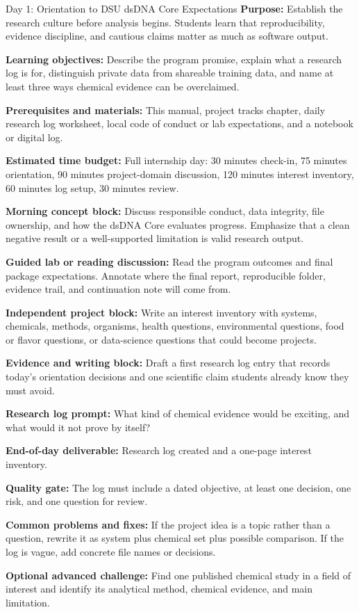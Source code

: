 \begin{dailybox}{Day 1: Orientation to DSU dsDNA Core Expectations}
\textbf{Purpose:} Establish the research culture before analysis begins. Students learn that reproducibility, evidence discipline, and cautious claims matter as much as software output.

\textbf{Learning objectives:} Describe the program promise, explain what a research log is for, distinguish private data from shareable training data, and name at least three ways chemical evidence can be overclaimed.

\textbf{Prerequisites and materials:} This manual, project tracks chapter, daily research log worksheet, local code of conduct or lab expectations, and a notebook or digital log.

\textbf{Estimated time budget:} Full internship day: 30 minutes check-in, 75 minutes orientation, 90 minutes project-domain discussion, 120 minutes interest inventory, 60 minutes log setup, 30 minutes review.

\textbf{Morning concept block:} Discuss responsible conduct, data integrity, file ownership, and how the dsDNA Core evaluates progress. Emphasize that a clean negative result or a well-supported limitation is valid research output.

\textbf{Guided lab or reading discussion:} Read the program outcomes and final package expectations. Annotate where the final report, reproducible folder, evidence trail, and continuation note will come from.

\textbf{Independent project block:} Write an interest inventory with systems, chemicals, methods, organisms, health questions, environmental questions, food or flavor questions, or data-science questions that could become projects.

\textbf{Evidence and writing block:} Draft a first research log entry that records today's orientation decisions and one scientific claim students already know they must avoid.

\textbf{Research log prompt:} What kind of chemical evidence would be exciting, and what would it not prove by itself?

\textbf{End-of-day deliverable:} Research log created and a one-page interest inventory.

\textbf{Quality gate:} The log must include a dated objective, at least one decision, one risk, and one question for review.

\textbf{Common problems and fixes:} If the project idea is a topic rather than a question, rewrite it as system plus chemical set plus possible comparison. If the log is vague, add concrete file names or decisions.

\textbf{Optional advanced challenge:} Find one published chemical study in a field of interest and identify its analytical method, chemical evidence, and main limitation.
\end{dailybox}

